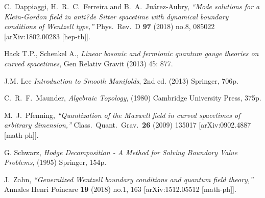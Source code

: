 \documentclass[
11pt,,a4paper %
]{book} %
\theoremstyle{TheoremStyle}
\theoremstyle{ExampleAndRemarkStyle}
\theoremstyle{ProofStyle}
\begin{document}
\begin{thebibliography}{}
	C.~Dappiaggi, H.~R.~C.~Ferreira and B.~A.~Juárez-Aubry,
	\emph{``Mode solutions for a Klein-Gordon field in anti?de Sitter spacetime with dynamical boundary conditions of Wentzell type,''}
	Phys.\ Rev.\ D {\bf 97} (2018) no.8,  085022
	[arXiv:1802.00283 [hep-th]].
	
	Hack T.P., Schenkel A.,
	\textit{Linear bosonic and fermionic quantum gauge theories on curved spacetimes},
	Gen Relativ Gravit (2013) 45: 877.
	
	J.M. Lee
	\textit{Introduction to Smooth Manifolds}, 2nd ed. (2013) Springer, 706p.
	
	C.~R.~F.~Maunder,
	\textit{Algebraic Topology}, (1980) Cambridge University Press, 375p.
	
	M.~J.~Pfenning,
	{\em ``Quantization of the Maxwell field in curved spacetimes of arbitrary dimension,''}
	Class.\ Quant.\ Grav.\  {\bf 26} (2009) 135017
	[arXiv:0902.4887 [math-ph]].
	
	G. Schwarz, 
	\textit{Hodge Decomposition - A Method for Solving Boundary Value Problems}, (1995) Springer, 154p.
	
	J.~Zahn,
	\emph{``Generalized Wentzell boundary conditions and quantum field theory,''}
	Annales Henri Poincare {\bf 19} (2018) no.1,  163
	[arXiv:1512.05512 [math-ph]].
	
\end{thebibliography}


\end{document}
